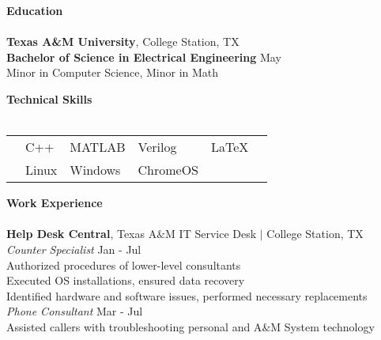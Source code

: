 \documentclass[12pt]{article}
\begin{document}
\begin{flushleft}
\begin{outline}[compactitem]

\newlength{\upspacelength}
\setlength{\upspacelength}{0px}
\newcommand{\upspace}{\vspace{\upspacelength}}
\newcommand{\zzz}[1]{\upspace \0 \textbf{#1} \\ \vspace{-0.8\baselineskip} \hrulefill \vspace{-2px} \\ }
\let\oldOne\1\let\oldTwo\2\let\oldThree\3\let\oldFour\4
\renewcommand{\1}{\upspace \oldOne  }
\renewcommand{\2}{\upspace \oldTwo  }
\renewcommand{\3}{\upspace \oldThree}
\renewcommand{\4}{\upspace \oldFour }
\hfill \break
\zzz{Education}
  \1 \textbf{Texas A\&M University}, College Station, TX 
  \\ \textbf{Bachelor of Science in Electrical Engineering} \hfill May 
  \\ Minor in Computer Science, Minor in Math

\zzz{Technical Skills}
\smallskip
    \begin{tabularx}{\textwidth}{X X X X X X}
    & C++     & MATLAB  & Verilog       & \LaTeX    & \upspace \\
    & Linux   & Windows & ChromeOS      &           & \upspace \\
    \end{tabularx}
    \vspace{-5px}\upspace

\zzz{Work Experience}

  \1 \textbf{Help Desk Central}, Texas A$\&$M IT Service Desk $|$  College Station, TX
  \\ \textit{Counter Specialist} \hfill Jan  - Jul 
  \\    Authorized procedures of lower-level consultants
  \\    Executed OS installations, ensured data recovery
  \\    Identified hardware and software issues, performed necessary replacements
  \\    \textit{Phone Consultant} \hfill Mar  - Jul 
  \\    Assisted callers with troubleshooting personal and A$\&$M System technology 


\end{outline}
\end{flushleft}
\end{document}
